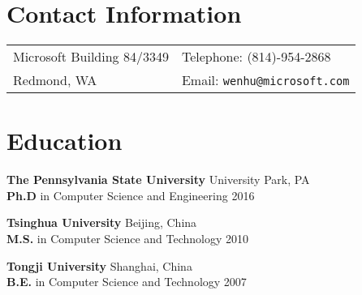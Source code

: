 \documentclass[margin,line]{res}
\begin{document}

\begin{resume}
\section{\sc Contact Information}
\vspace{.05in}
\begin{tabular}{@{}p{3.5in}p{2.3in}}
Microsoft Building 84/3349   & \hfill  Telephone: (814)-954-2868\\
Redmond, WA  & \hfill Email: \texttt{wenhu@microsoft.com}
\end{tabular}



\section{\sc Education}

{\bf The Pennsylvania State University}  \hfill  University Park, PA\\
{ {\bf Ph.D} in Computer Science and Engineering} \hfill 2016 \\
\vspace{-0.25in}

{\bf Tsinghua University} \hfill Beijing, China\\
{{\bf M.S.} in Computer Science and Technology} \hfill 2010\\
\vspace{-0.25in}

{\bf Tongji University} \hfill Shanghai, China \\
{{\bf B.E.} in Computer Science and Technology} \hfill 2007
\vspace{-0.1in}


\end{resume}
\end{document}

